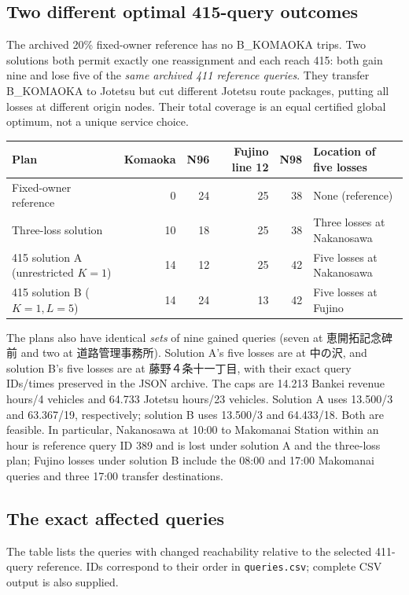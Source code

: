 \documentclass[10pt]{article}
\newcommand{\st}[1]{\texttt{\footnotesize #1}}
\begin{document}
\subsection*{Two different optimal 415-query outcomes}
The archived 20\% fixed-owner reference has no B\_KOMAOKA trips. Two solutions both permit exactly one reassignment and each reach 415: both gain nine and lose five of the \emph{same archived 411 reference queries}. They transfer B\_KOMAOKA to Jotetsu but cut different Jotetsu route packages, putting all losses at different origin nodes. Their total coverage is an equal certified global optimum, not a unique service choice.
\begin{center}\small
\begin{tabular}{@{}lrrrrp{3.2cm}@{}}\toprule
Plan & Komaoka & N96 & Fujino line 12 & N98 & Location of five losses \\\midrule
Fixed-owner reference & 0 & 24 & 25 & 38 & None (reference) \\
Three-loss solution & 10 & 18 & 25 & 38 & Three losses at Nakanosawa \\
415 solution A (unrestricted $K=1$) & 14 & 12 & 25 & 42 & Five losses at Nakanosawa \\
415 solution B ($K=1,L=5$) & 14 & 24 & 13 & 42 & Five losses at Fujino \\\bottomrule
\end{tabular}
\end{center}
The plans also have identical \emph{sets} of nine gained queries (seven at 恵開拓記念碑前 and two at 道路管理事務所). Solution A's five losses are at 中の沢, and solution B's five losses are at 藤野４条十一丁目, with their exact query IDs/times preserved in the JSON archive. The caps are 14.213 Bankei revenue hours/4 vehicles and 64.733 Jotetsu hours/23 vehicles. Solution A uses 13.500/3 and 63.367/19, respectively; solution B uses 13.500/3 and 64.433/18. Both are feasible. In particular, Nakanosawa at 10:00 to Makomanai Station within an hour is reference query ID 389 and is lost under solution A and the three-loss plan; Fujino losses under solution B include the 08:00 and 17:00 Makomanai queries and three 17:00 transfer destinations.

\subsection*{The exact affected queries}
The table lists the queries with changed reachability relative to the selected 411-query reference. IDs correspond to their order in \st{queries.csv}; complete CSV output is also supplied.
\end{document}
